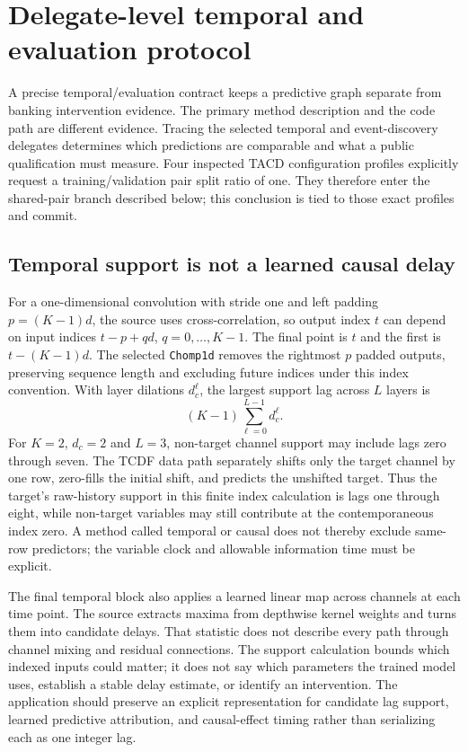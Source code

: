 \section[Delegate-level temporal and evaluation protocol]{Delegate-level temporal and evaluation protocol}
\label{sec:exec28-at2}
A precise temporal/evaluation contract keeps a predictive graph separate from banking intervention evidence.
The primary method description and the code path are different evidence. Tracing the selected
temporal and event-discovery delegates determines which predictions are comparable and what
a public qualification must measure. Four inspected TACD
configuration profiles explicitly request a training/validation pair split ratio of one. They
therefore enter the shared-pair branch described below; this conclusion is tied to those exact
profiles and commit.

\subsection{Temporal support is not a learned causal delay}
For a one-dimensional convolution with stride one and left padding $p=(K-1)d$, the source uses
cross-correlation, so output index $t$ can depend on input indices
$t-p+qd$, $q=0,\ldots,K-1$. The final point is $t$ and the first is $t-(K-1)d$.
The selected \texttt{Chomp1d} removes the rightmost $p$ padded outputs, preserving sequence
length and excluding future indices under this index convention. With layer dilations
$d_c^\ell$, the largest support lag across $L$ layers is
\[
  (K-1)\sum_{\ell=0}^{L-1}d_c^\ell.
\]
For $K=2$, $d_c=2$ and $L=3$, non-target channel support may include lags zero through seven.
The TCDF data path separately shifts only the target channel by one row, zero-fills the initial
shift, and predicts the unshifted target. Thus the target's raw-history support in this finite
index calculation is lags one through eight, while non-target variables may still contribute
at the contemporaneous index zero. A method called temporal or causal does not thereby exclude
same-row predictors; the variable clock and allowable information time must be explicit.
\citep{exec28_at_tcdf_temporal,exec28_at_protocol_reference}

The final temporal block also applies a learned linear map across channels at each time point.
The source extracts maxima from depthwise kernel weights and turns them into candidate delays.
That statistic does not describe every path through channel mixing and residual connections.
The support calculation bounds which indexed inputs could matter; it does not say which
parameters the trained model uses, establish a stable delay estimate, or identify an intervention.
The application should preserve an explicit representation for candidate lag support, learned
predictive attribution, and causal-effect timing rather than serializing each as one integer lag.
\citep{exec28_at_tcdf_temporal}


